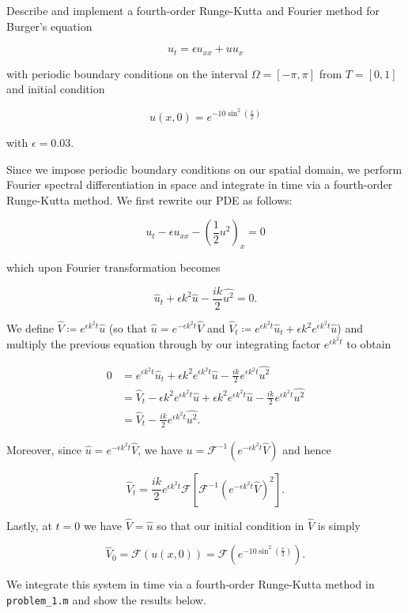 Describe and implement a fourth-order Runge-Kutta and Fourier method for Burger's equation 

$$
u_t = \epsilon u_{xx} + u u_x
$$

with periodic boundary conditions on the interval $\Omega = [-\pi, \pi]$ from $T = [0, 1]$ and initial condition

$$
u(x, 0) = e^{-10 \sin^2{\left( \frac{x}{2} \right)}}
$$

with $\epsilon = 0.03$.

\begin{solution}
  Since we impose periodic boundary conditions on our spatial domain, we perform Fourier spectral differentiation in 
  space and integrate in time via a fourth-order Runge-Kutta method. We first rewrite our PDE as follows:

  $$
  u_t - \epsilon u_{xx} - \left(\frac{1}{2} u^2 \right)_x = 0
  $$

  which upon Fourier transformation becomes

  $$
  \hat{u}_t + \epsilon k^2 \hat{u} - \frac{ik}{2} \widehat{u^2} = 0.
  $$

  We define $\widehat{V} \coloneqq e^{\epsilon k^2 t} \hat{u}$ (so that $\widehat{u} = e^{-\epsilon k^2 t} \widehat{V}$ 
  and $\widehat{V}_t \coloneqq e^{\epsilon k^2 t} \hat{u}_t + \epsilon k^2 e^{\epsilon k^2 t} \hat{u}$) and multiply 
  the previous equation through by our integrating factor $e^{\epsilon k^2 t}$ to obtain

  \begin{align*}
    0 &= e^{\epsilon k^2 t} \hat{u}_t + \epsilon k^2 e^{\epsilon k^2 t} \hat{u} - \frac{ik}{2} e^{\epsilon k^2 t} \widehat{u^2} \\
      &= \widehat{V}_t - \epsilon k^2 e^{\epsilon k^2 t} \hat{u} + \epsilon k^2 e^{\epsilon k^2 t} \hat{u} - \frac{ik}{2} e^{\epsilon k^2 t} \widehat{u^2} \\
      &= \widehat{V}_t - \frac{ik}{2} e^{\epsilon k^2 t} \widehat{u^2}.
  \end{align*}

  Moreover, since $\hat{u} = e^{-\epsilon k^2 t} \widehat{V}$, we have 
  $u = \mathcal{F}^{-1}\left( e^{-\epsilon k^2 t} \widehat{V} \right)$ and hence

  $$
  \widehat{V}_t = \frac{ik}{2} e^{\epsilon k^2 t} \mathcal{F} \left[ \mathcal{F}^{-1}\left( e^{-\epsilon k^2 t} \widehat{V} \right)^2 \right].
  $$

  Lastly, at $t = 0$ we have $\widehat{V} = \hat{u}$ so that our initial condition in $\widehat{V}$ is simply

  $$
  \widehat{V}_0 = \mathcal{F}(u(x, 0)) = \mathcal{F}\left( e^{-10 \sin^2{\left( \frac{x}{2} \right)}} \right).
  $$

  We integrate this system in time via a fourth-order Runge-Kutta method in \texttt{problem\_1.m} and show the results
  below.

  \ \\
  \vfill
\end{solution}